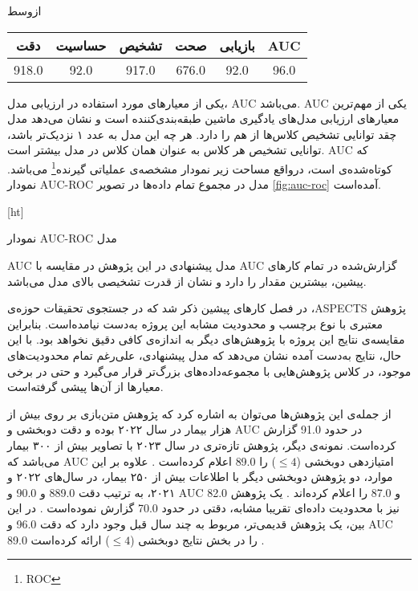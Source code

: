 \vspace{1.5em}

‌ازوسط

\begin{tabular}{cccccc}
    \hline
     
    دقت     & حساسیت & تشخیص & صحت     & بازیابی   & AUC \\ \hline
    918.0   & 92.0    & 917.0 & 676.0   & 92.0       & 96.0   \\ \hline
    \end{tabular}


یکی از معیار‌های مورد استفاده در ارزیابی مدل، AUC می‌باشد.
AUC یکی از مهم‌ترین معیارهای ارزیابی مدل‌های یادگیری ماشین طبقه‌بندی‌کننده است و
نشان می‌دهد مدل چقد توانایی تشخیص کلاس‌ها از هم را دارد.
هر چه این مدل به عدد ۱ نزدیک‌تر باشد، توانایی تشخیص هر کلاس به عنوان همان کلاس در مدل بیشتر است.
AUC که کوتاه‌شده‌ی  است، درواقع مساحت زیر نمودار مشخصه‌ی عملیاتی گیرنده\footnote{ROC} می‌باشد.
نمودار AUC-ROC مدل در مجموع تمام داده‌ها در تصویر \ref{fig:auc-roc} آمده‌است.

[ht]
\caption[نمودار AUC-ROC مدل]{نمودار AUC-ROC مدل}

AUC مدل پیشنهادی در این پژوهش در مقایسه با AUC گزارش‌شده در تمام کار‌های پیشین، بیشترین مقدار را دارد و نشان از قدرت تشخیصی بالای مدل می‌باشد.


در فصل کارهای پیشین ذکر شد که در جستجوی تحقیقات حوزه‌ی ،ASPECTS
پژوهش معتبری با نوع برچسب و محدودیت مشابه این پروژه به‌دست نیامده‌است.
بنابراین مقایسه‌ی نتایج این پروژه با پژوهش‌های دیگر به اندازه‌ی کافی دقیق نخواهد بود.
با این حال،
نتایج به‌دست آمده نشان می‌دهد که
مدل پیشنهادی، علی‌رغم تمام محدودیت‌های موجود، در کلاس پژوهش‌هایی با مجموعه‌داده‌های بزرگ‌تر قرار می‌گیرد و
حتی در برخی معیارها از آن‌ها پیشی گرفته‌است.

از جمله‌ی این پژوهش‌ها  
می‌توان به 
\cite{cao2022deep} اشاره کرد که 
پژوهش متن‌بازی بر روی بیش از هزار بیمار در سال ۲۰۲۲ بوده و دقت دوبخشی و AUC در حدود 91.0 گزارش کرده‌است.
نمونه‌ی دیگر، پژوهش تازه‌تری در سال ۲۰۲۳ با تصاویر بیش از ۳۰۰ بیمار می‌باشد که AUC امتیازدهی دوبخشی ($\leq 4$) را 89.0 اعلام کرده‌است \cite{lee2023clinical}.
علاوه بر این موارد، دو پژوهش دوبخشی دیگر با اطلاعات بیش از ۲۵۰ بیمار، در سال‌های ۲۰۲۲ و ۲۰۲۱، به ترتیب دقت
889.0 و
90.0
و
AUC
82.0 
و 
87.0 
را اعلام کرده‌اند \cite{chiang2022deep,kuang2021eis}.
یک پژوهش نیز با محدودیت داده‌ای تقریبا مشابه، دقتی در حدود 70.0 گزارش نموده‌است \cite{yu2021automated}.
در این بین، یک پژوهش قدیمی‌تر، مربوط به چند سال قبل وجود دارد که دقت 96.0 و AUC 89.0 را در بخش نتایج دو‌بخشی ($\leq 4$) ارائه کرده‌است \cite{kuang2019automated}.

